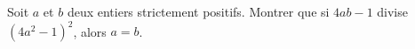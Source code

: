 Soit $a$ et $b$ deux entiers strictement positifs. Montrer que si $4ab - 1$ divise $(4a^2 - 1)^2$, alors
$a = b$.
